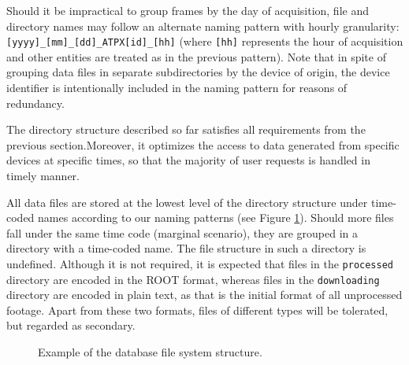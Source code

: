 Should it be impractical to group frames by the day of acquisition, file and directory names may follow an alternate naming pattern with hourly granularity: \texttt{[yyyy]\_[mm]\_[dd]\_ATPX[id]\_[hh]} (where \texttt{[hh]} represents the hour of acquisition and other entities are treated as in the previous pattern). Note that in spite of grouping data files in separate subdirectories by the device of origin, the device identifier is intentionally included in the naming pattern for reasons of redundancy.

The directory structure described so far satisfies all requirements from the previous section.Moreover, it optimizes the access to data generated from specific devices at specific times, so that the majority of user requests is handled in timely manner.

All data files are stored at the lowest level of the directory structure under time-coded names according to our naming patterns (see Figure \ref{fig:db-structure}). Should more files fall under the same time code (marginal scenario), they are grouped in a directory with a time-coded name. The file structure in such a directory is undefined. Although it is not required, it is expected that files in the \texttt{processed} directory are encoded in the ROOT format, whereas files in the \texttt{downloading} directory are encoded in plain text, as that is the initial format of all unprocessed footage. Apart from these two formats, files of different types will be tolerated, but regarded as secondary.

\begin{figure}[t]
\begin{center}


\caption{Example of the database file system structure.}
\label{fig:db-structure}
\end{center}
\end{figure}

